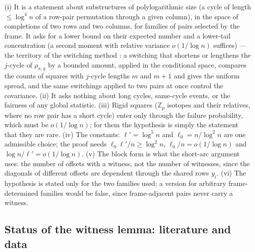 \begin{remark}
(i) It is a statement about substructures of polylogarithmic size
(a cycle of length $\le\log^4n$ of a row-pair permutation through a
given column), in the space of completions of two rows and two
columns, for families of pairs selected by the frame.  It asks for a
lower bound on their expected number and a lower-tail
concentration (a second moment with relative variance $o(1/\log n)$
suffices) --- the territory of
the switching method \cite{KS18}: a switching that shortens or lengthens
the $j$-cycle of $\rho_{x,y}$ by a bounded amount, applied in the
conditional space, compares the counts of squares with
$j$-cycle lengths $m$ and $m+1$ and gives the uniform spread, and the
same switchings applied to two pairs at once control the covariance.
(ii) It asks nothing about long cycles, same-cycle events, or the
fairness of any global statistic.  (iii) Rigid squares ($\mathbb Z_p$
isotopes and their relatives, where no row pair has a short cycle)
enter only through the failure probability, which must be
$o(1/\log n)$; for them the hypothesis is simply the statement that
they are rare.  (iv) The constants: $\ell'=\log^5n$ and
$\ell_0=n/\log^2n$ are one admissible choice; the proof needs
$\ell_0\ell'/n\ge\log^2n$, $\ell_0/n=o(1/\log n)$ and
$\log n/\ell'=o(1/\log n)$.  (v) The block form is what the
short-arc argument uses: the number of offsets with a witness, not the
number of witnesses, since the diagonals of different offsets are
dependent through the shared rows $y_i$.  (vi) The hypothesis is
stated only for the two families used; a version for arbitrary
frame-determined families would be false, since frame-adjacent pairs
never carry a witness.
\end{remark}

\subsection{Status of the witness lemma: literature and data}\label{sec:witnessstatus}

